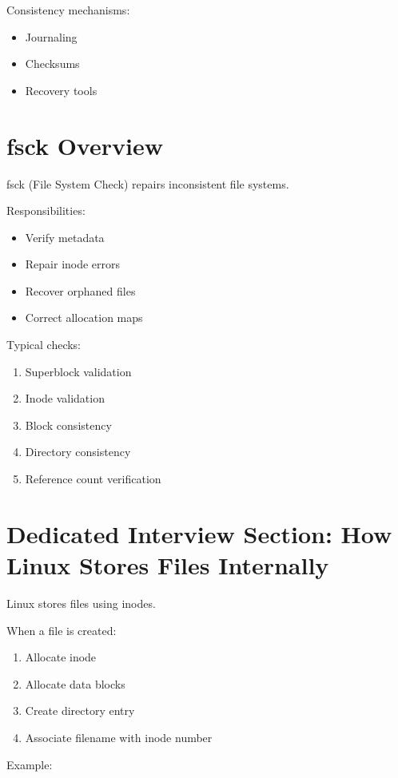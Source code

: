 Consistency mechanisms:

\begin{itemize}
\item Journaling
\item Checksums
\item Recovery tools
\end{itemize}

\section{fsck Overview}

fsck (File System Check) repairs inconsistent file systems.

Responsibilities:

\begin{itemize}
\item Verify metadata
\item Repair inode errors
\item Recover orphaned files
\item Correct allocation maps
\end{itemize}

Typical checks:

\begin{enumerate}
\item Superblock validation
\item Inode validation
\item Block consistency
\item Directory consistency
\item Reference count verification
\end{enumerate}

\section{Dedicated Interview Section: How Linux Stores Files Internally}

Linux stores files using inodes.

When a file is created:

\begin{enumerate}
\item Allocate inode
\item Allocate data blocks
\item Create directory entry
\item Associate filename with inode number
\end{enumerate}

Example:

